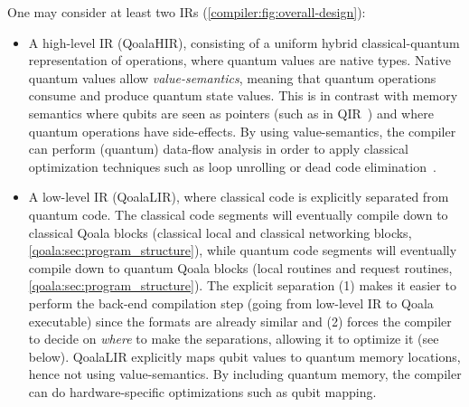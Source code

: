 One may consider at least two \ac{IR}s (\cref{compiler:fig:overall-design}):
\begin{itemize}
  \item A high-level \ac{IR} (QoalaHIR), consisting of a uniform hybrid classical-quantum representation of operations, where quantum values are native types.
  Native quantum values allow \emph{value-semantics}, meaning that quantum operations consume and produce quantum state values.
  This is in contrast with memory semantics where qubits are seen as pointers (such as in QIR~\cite{haner_software_2018, geller_introducing_2020}) and where quantum operations have side-effects.
  By using value-semantics, the compiler can perform (quantum) data-flow analysis in order to apply classical optimization techniques such as loop unrolling or dead code elimination~\cite{peduri_qssa_2022, ittah_enabling_2022}. 
  \item A low-level \ac{IR} (QoalaLIR), where classical code is explicitly separated from quantum code.
  The classical code segments will eventually compile down to classical Qoala blocks (classical local and classical networking blocks, \cref{qoala:sec:program_structure}), while quantum code segments will eventually compile down to quantum Qoala blocks (local routines and request routines, \cref{qoala:sec:program_structure}).
  The explicit separation (1) makes it easier to perform the back-end compilation step (going from low-level IR to Qoala executable) since the formats are already similar and (2) forces the compiler to decide on \emph{where} to make the separations, allowing it to optimize it (see below).
  QoalaLIR explicitly maps qubit values to quantum memory locations, hence not using value-semantics.
  By including quantum memory, the compiler can do hardware-specific optimizations such as qubit mapping.
\end{itemize}


